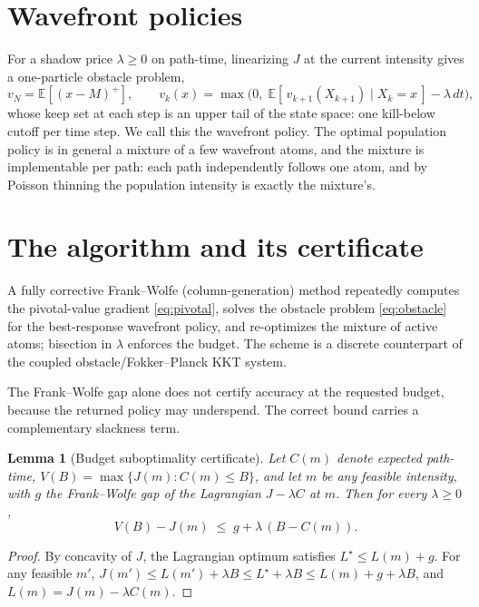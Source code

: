 \documentclass[11pt]{article}
\theoremstyle{itheads}
\newtheorem{lemma}{Lemma}
\newcommand{\E}{\mathbb{E}}
\begin{document}
\section{Wavefront policies}

For a shadow price $\lambda \ge 0$ on path-time, linearizing $J$ at the
current intensity gives a one-particle obstacle problem,
\begin{equation}
v_N = \E[(x - M)^+], \qquad
v_k(x) = \max\!\big(0,\; \E[\,v_{k+1}(X_{k+1}) \mid X_k = x\,] -
\lambda\, dt\big),
\label{eq:obstacle}
\end{equation}
whose keep set at each step is an upper tail of the state space: one
kill-below cutoff per time step. We call this the wavefront policy. The
optimal population policy is in general a mixture of a few wavefront
atoms, and the mixture is implementable per path: each path independently
follows one atom, and by Poisson thinning the population intensity is
exactly the mixture's.

\section{The algorithm and its certificate}

A fully corrective Frank--Wolfe (column-generation) method repeatedly
computes the pivotal-value gradient \eqref{eq:pivotal}, solves the
obstacle problem \eqref{eq:obstacle} for the best-response wavefront
policy, and re-optimizes the mixture of active atoms; bisection in
$\lambda$ enforces the budget. The scheme is a discrete counterpart of
the coupled obstacle/Fokker--Planck KKT system.

The Frank--Wolfe gap alone does not certify accuracy at the requested
budget, because the returned policy may underspend. The correct bound
carries a complementary slackness term.

\begin{lemma}[Budget suboptimality certificate]
Let $C(m)$ denote expected path-time, $V(B) = \max\{J(m) : C(m) \le B\}$,
and let $m$ be any feasible intensity, with $g$ the Frank--Wolfe gap of
the Lagrangian $J - \lambda C$ at $m$. Then for every $\lambda \ge 0$,
\[
V(B) - J(m) \;\le\; g + \lambda\,(B - C(m)).
\]
\end{lemma}

\begin{proof}
By concavity of $J$, the Lagrangian optimum satisfies $L^\star \le
L(m) + g$. For any feasible $m'$, $J(m') \le L(m') + \lambda B \le
L^\star + \lambda B \le L(m) + g + \lambda B$, and $L(m) = J(m) -
\lambda C(m)$.
\end{proof}
\end{document}
